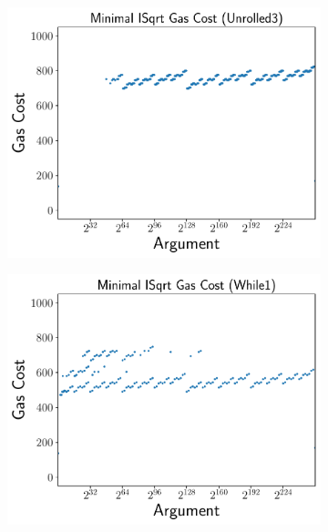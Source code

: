 \begin{figure}[p]
\centering
    \begin{subfigure}[t]{0.45\textwidth}
    \includegraphics[width=\textwidth]{plots/minimal_plot_Unrolled3.pdf}
    \end{subfigure}
    \begin{subfigure}[t]{0.45\textwidth}
    \includegraphics[width=\textwidth]{plots/minimal_plot_While1.pdf}
    \end{subfigure}


\end{figure}
